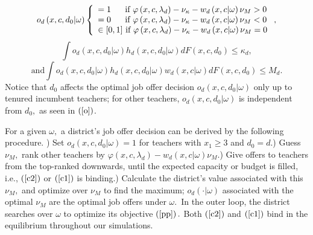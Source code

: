 \documentclass[notitlepage,12pt]{article}%
\begin{document}
\begin{equation}
o_{d}\left(  x,c,d_{0}|\omega\right)  \left\{
\begin{array}
[c]{l}%
=1\text{ \ \ \ \ if }\varphi\left(  x,c,\lambda_{d}\right)  -\nu_{\kappa
}-w_{d}\left(  x,c|\omega\right)  \nu_{M}>0\\
=0\text{ \ \ \ \ if }\varphi\left(  x,c,\lambda_{d}\right)  -\nu_{\kappa
}-w_{d}\left(  x,c|\omega\right)  \nu_{M}<0\\
\in\lbrack0,1]\text{ if }\varphi\left(  x,c,\lambda_{d}\right)  -\nu_{\kappa
}-w_{d}\left(  x,c|\omega\right)  \nu_{M}=0
\end{array}
\right.  , \label{o}%
\end{equation}%
\begin{equation}
\int o_{d}\left(  x,c,d_{0}|\omega\right)  h_{d}\left(  x,c,d_{0}%
|\omega\right)  dF\left(  x,c,d_{0}\right)  \leq\kappa_{d}, \label{c2}%
\end{equation}%
\begin{equation}
\text{and}\int o_{d}\left(  x,c,d_{0}|\omega\right)  h_{d}\left(
x,c,d_{0}|\omega\right)  w_{d}\left(  x,c|\omega\right)  dF\left(
x,c,d_{0}\right)  \leq M_{d}. \label{c1}%
\end{equation}
Notice that $d_{0}$ affects the optimal job offer decision $o_{d}\left(
x,c,d_{0}|\omega\right)  $ only up to tenured incumbent teachers; for other
teachers, $o_{d}\left(  x,c,d_{0}|\omega\right)  $ is independent from
$d_{0},$ as seen in $\left(  \ref{o}\right)  $.

For a given $\omega,$ a district's job offer decision can be derived by the
following procedure. ) Set $o_{d}\left(  x,c,d_{0}|\omega\right)  =1$
for teachers with $x_{1}\geq3$ and $d_{0}=d.$) Guess $\nu_{M},$ rank
other teachers by $\varphi\left(  x,c,\lambda_{d}\right)  -w_{d}\left(
x,c|\omega\right)  \nu_{M}.$) Give offers to teachers from the
top-ranked downwards, until the expected capacity or budget is filled, i.e.,
$\left(  \ref{c2}\right)  $ or $\left(  \ref{c1}\right)  $ is binding.) Calculate the district's value associated with this $\nu_{M},$ and optimize
over $\nu_{M}$ to find the maximum; $o_{d}\left(  \cdot|\omega\right)  $
associated with the optimal $\nu_{M}$ are the optimal job offers under
$\omega.$\ \newline In the outer loop, the district searches over $\omega$ to
optimize its objective $\left(  \ref{pp}\right)  .$ Both $\left(
\ref{c2}\right)  $ and $\left(  \ref{c1}\right)  $ bind in the equilibrium
throughout our simulations.
\end{document}
